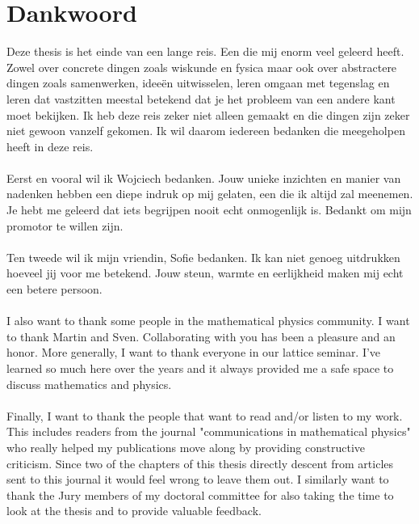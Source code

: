 \chapter*{Dankwoord}                                  \label{ch:preface}

Deze thesis is het einde van een lange reis. Een die mij enorm veel geleerd heeft. Zowel over concrete dingen zoals wiskunde en fysica maar ook over abstractere dingen zoals samenwerken, ideeën uitwisselen, leren omgaan met tegenslag en leren dat vastzitten meestal betekend dat je het probleem van een andere kant moet bekijken. Ik heb deze reis zeker niet alleen gemaakt  en die dingen zijn zeker niet gewoon vanzelf gekomen. Ik wil daarom iedereen bedanken die meegeholpen heeft in deze reis.
\\\\
Eerst en vooral wil ik Wojciech bedanken. Jouw unieke inzichten en manier van nadenken hebben een diepe indruk op mij gelaten, een die ik altijd zal meenemen. Je hebt me geleerd dat iets begrijpen nooit echt onmogenlijk is. Bedankt om mijn promotor te willen zijn.
\\\\
Ten tweede wil ik mijn vriendin, Sofie bedanken. Ik kan niet genoeg uitdrukken hoeveel jij voor me betekend. Jouw steun, warmte en eerlijkheid maken mij echt een betere persoon.
\\\\
I also want to thank some people in the mathematical physics community. I want to thank Martin and Sven. Collaborating with you has been a pleasure and an honor. More generally, I want to thank everyone in our lattice seminar. I've learned so much here over the years and it always provided me a safe space to discuss mathematics and physics.
\\\\
Finally, I want to thank the people that want to read and/or listen to my work. This includes readers from the journal "communications in mathematical physics" who really helped my publications move along by providing constructive criticism. Since two of the chapters of this thesis directly descent from articles sent to this journal it would feel wrong to leave them out. I similarly want to thank the Jury members of my doctoral committee for also taking the time to look at the thesis and to provide valuable feedback.

\instructionspreface


\cleardoublepage

